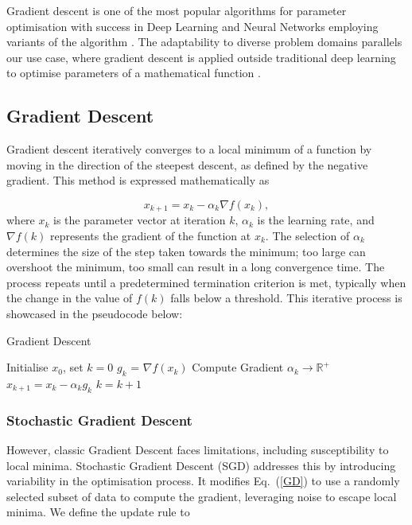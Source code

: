 \documentclass[a4paper]{report}
\begin{document}
Gradient descent is one of the most popular algorithms for parameter optimisation with success in Deep Learning and Neural Networks employing variants of the algorithm \citep{lu2017improved, zhang2019gradient, zeebaree2019trainable}. The adaptability to diverse problem domains \citep{YingjieYugiHaibin2023SGD} parallels our use case, where gradient descent is applied outside traditional deep learning to optimise parameters of a mathematical function \citep{GradientBasedOpt2022}.

\subsection{Gradient Descent}
Gradient descent iteratively converges to a local minimum of a function by moving in the direction of the steepest descent, as defined by the negative gradient. This method is expressed mathematically as

\begin{equation}\label{GD}
    x_{k+1} = x_k - \alpha_k \nabla f(x_k),
\end{equation}
where $x_k$ is the parameter vector at iteration $k$, $\alpha_k$ is the learning rate, and $\nabla f(k)$ represents the gradient of the function at $x_k$. The selection of $\alpha_k$ determines the size of the step taken towards the minimum; too large can overshoot the minimum, too small can result in a long convergence time. The process repeats until a predetermined termination criterion is met, typically when the change in the value of $f(k)$ falls below a threshold. This iterative process is showcased in the pseudocode below:

\begin{algorithm}
\caption{Gradient Descent}
\label{algo:gradient_descent}
\begin{algorithmic}[1]
\State Initialise \( x_0 \), set \( k = 0 \)
    \State $g_k$ = \( \nabla f(x_k) \) \Comment Compute Gradient
    \State $\alpha_k \rightarrow \mathbb{R}^+$
    \State $x_{k+1} = x_k - \alpha_k g_k$
    \State \( k = k + 1 \)
\EndWhile
\end{algorithmic}
\end{algorithm}

\subsubsection{Stochastic Gradient Descent}
However, classic Gradient Descent faces limitations, including susceptibility to local minima. Stochastic Gradient Descent (SGD) addresses this by introducing variability in the optimisation process. It modifies Eq.~(\ref{GD}) to use a randomly selected subset of data to compute the gradient, leveraging noise to escape local minima. We define the update rule to 
\end{document}
